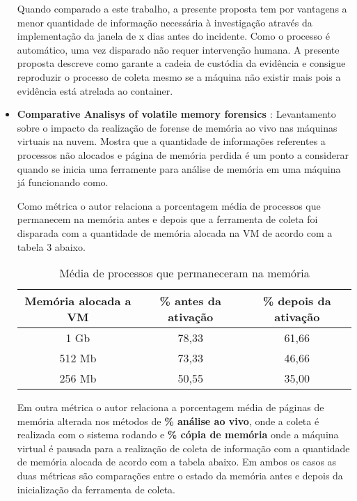 \documentclass[
	12pt,				%
	openright,			%
	oneside,			%
	a4paper,			%
	english,			%
	french,				%
	spanish,			%
	brazil,				%
	]{abntex2}
\begin{document}
\begin{itemize}
Quando comparado a este trabalho, a presente proposta tem por vantagens a menor quantidade de informação necessária à investigação através da implementação da janela de x
dias antes do incidente. Como o processo é automático, uma vez disparado não requer intervenção humana. A presente proposta descreve como garante a cadeia de custódia da 
evidência e consigue reproduzir o processo de coleta mesmo se a máquina não existir  mais pois a evidência está atrelada ao container.

\item \textbf{Comparative Analisys of volatile memory forensics \cite{Aljaedi2011} }: Levantamento sobre o impacto da realização de forense de memória ao vivo nas máquinas
virtuais na nuvem. Mostra que a quantidade de informações referentes a processos não alocados e página de memória perdida é um ponto a considerar quando se inicia uma
ferramente para análise de memória em uma máquina já funcionando como.

Como métrica o autor relaciona a porcentagem média de processos que permanecem na memória antes e depois que a ferramenta de coleta foi disparada com a quantidade de memória
alocada na VM de acordo com a tabela 3 abaixo.

\begin{table}[h!]
\centering
\caption{Média de processos que permaneceram na memória}
\label{my-label}
\begin{tabular}{c|c|c}
\hline
\textbf{Memória alocada a VM} & \textbf{\% antes da ativação} 			  & \textbf{\% depois da ativação} \\ \hline
1 Gb                          & 78,33                                             & 61,66                          \\ \hline
512 Mb                        & 73,33                                             & 46,66                          \\ \hline
256 Mb                        & 50,55                                             & 35,00                                                          
\end{tabular}
\end{table}

Em outra métrica o autor relaciona a porcentagem média de páginas de memória alterada nos métodos de \textbf{\% análise ao vivo}, onde a coleta é realizada com o sistema rodando e 
\textbf{\% cópia de memória} onde a máquina virtual é pausada para a realização de coleta de informação com a quantidade de memória alocada de acordo com a tabela abaixo. Em ambos
os casos as duas métricas são comparações entre o estado da memória antes e depois da inicialização da ferramenta de coleta.


\end{itemize}
\end{document}
